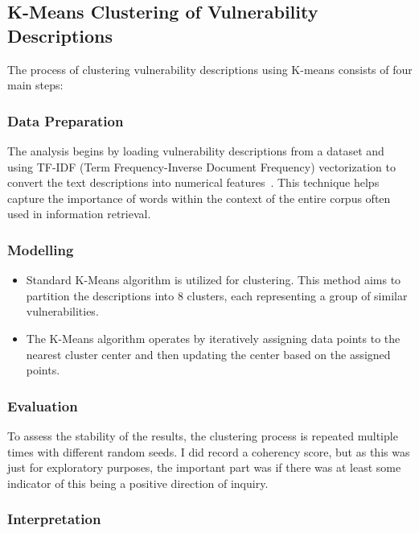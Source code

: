 \documentclass[12pt]{article}
\begin{document}
\subsection{K-Means Clustering of Vulnerability Descriptions}

The process of clustering vulnerability descriptions using K-means consists of four main steps:

\subsubsection*{Data Preparation}

The analysis begins by loading vulnerability descriptions from a dataset and using TF-IDF
(Term Frequency-Inverse Document Frequency) vectorization to convert the text
descriptions into numerical features~\cite{tfidf}. This technique helps capture the
importance of words within the context of the entire corpus often used in information
retrieval.


\subsubsection*{Modelling}

\begin{itemize}

	\item Standard K-Means algorithm is utilized for clustering. This method aims to partition the
	      descriptions into 8 clusters, each representing a group of similar
	      vulnerabilities.

	\item The K-Means algorithm operates by iteratively assigning data points to the nearest cluster
	      center and then updating the center based on the assigned points.

\end{itemize}

\subsubsection*{Evaluation}


To assess the stability of the results, the clustering process is repeated multiple times
with different random seeds. I did record a coherency score, but as this was just for exploratory
purposes, the important part was if there was at least some indicator of this being a positive
direction of inquiry.


\subsubsection*{Interpretation}
\end{document}
